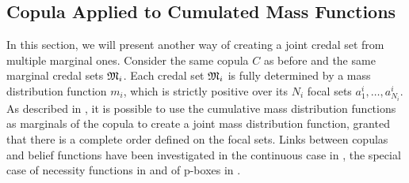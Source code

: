 \subsection{Copula Applied to Cumulated Mass Functions}\label{sec:joint_mass}
In this section, we will present another way of creating a joint credal set from multiple marginal ones. Consider the same copula $C$ as before and the same marginal credal sets ${\mathfrak{M}}_i$. Each credal set ${\mathfrak{M}}_i$ is fully determined by a mass distribution function $m_i$, which is strictly positive over its $N_i$ focal sets $a^i_1, \dots, a^i_{N_i}$. As described in \cite{ferson_dependence_2004}, it is possible to use the cumulative mass distribution functions as marginals of the copula to create a joint mass distribution function, granted that there is a complete order defined on the focal sets. Links between copulas and belief functions have been investigated in the continuous case in \cite{schmelzer_joint_2015, schmelzer_multivariate_2019}, the special case of necessity functions in \cite{schmelzer_sklars_2015} and of p-boxes in \cite{schmelzer_random_2023}.

